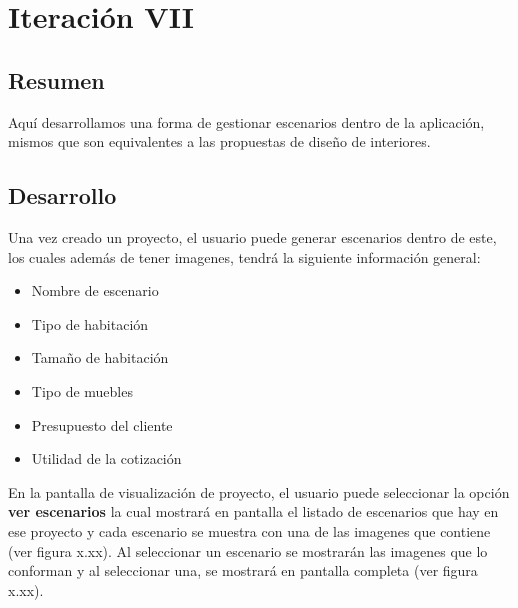 \section{Iteración VII}
\subsection{Resumen}
Aquí desarrollamos una forma de gestionar escenarios dentro de la aplicación, mismos que son equivalentes a las propuestas de diseño de interiores.

\subsection{Desarrollo}
Una vez creado un proyecto, el usuario puede generar escenarios dentro de este, los cuales además de tener imagenes, tendrá la siguiente información general:
\begin{itemize}
	\item Nombre de escenario
	\item Tipo de habitación
	\item Tamaño de habitación
	\item Tipo de muebles
	\item Presupuesto del cliente
	\item Utilidad de la cotización
\end{itemize}

En la pantalla de visualización de proyecto, el usuario puede seleccionar la opción \textbf{ver escenarios} la cual mostrará en pantalla el listado de escenarios que hay en ese proyecto y cada escenario se muestra con una de las imagenes que contiene (ver figura x.xx). Al seleccionar un escenario se mostrarán las imagenes que lo conforman y al seleccionar una, se mostrará en pantalla completa (ver figura x.xx). 

